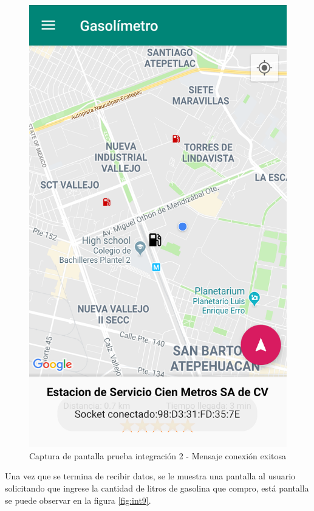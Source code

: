 \begin{figure}[H]
	\centering
	\includegraphics[scale=.2]{DocumentoTecnico/Capitulo6/integracion/Software/images/8.png}
	\caption{Captura de pantalla prueba integración 2 - Mensaje conexión exitosa}
	\label{fig:int8}
\end{figure}

Una vez que se termina de recibir datos, se le muestra una pantalla al usuario solicitando que ingrese la cantidad de litros de gasolina que compro, está pantalla se puede observar en la figura \ref{fig:int9}.

